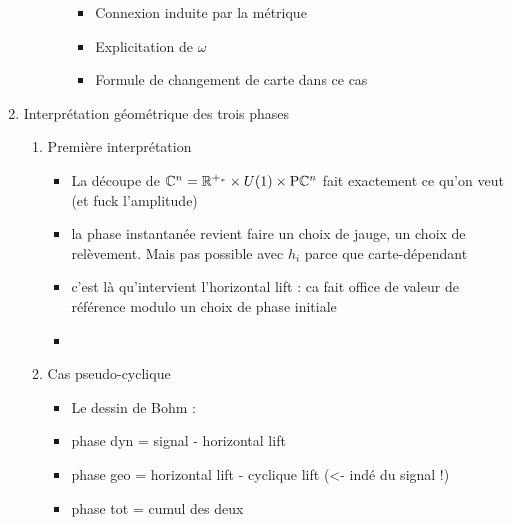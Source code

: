 \begin{enumerate}[label=\Roman* --- ]
\begin{enumerate}[label=\arabic{enumi}.\arabic* --- ]
\begin{enumerate}[label=\arabic{enumi}.2.\arabic* --- ]
\begin{itemize}
				\item Connexion induite par la métrique
				
				\item Explicitation de $\omega$
				
				\item Formule de changement de carte dans ce cas
			\end{itemize}
			
		\end{enumerate}
		
	\end{enumerate}
	
	\item Interprétation géométrique des trois phases
	
	\begin{enumerate}[label=\arabic{enumi}.\arabic* --- ]
		
		\item Première interprétation
		\begin{itemize} \normalfont
			
			\item La découpe de $\mathbb{C}^n = \mathbb{R}^{+_*}\times U(1) \times \text{\normalfont P}\mathbb{C}^{n}$ fait exactement ce qu'on veut (et fuck l'amplitude)
			
			\item la phase instantanée revient faire un choix de jauge, un choix de relèvement. Mais pas possible avec $h_i$ parce que carte-dépendant
			
			\item c'est là qu'intervient l'horizontal lift : ca fait office de valeur de référence modulo un choix de phase initiale
			
			\item 
		\end{itemize}
		
		\item Cas pseudo-cyclique
 		\begin{itemize} \normalfont
			
			\item Le dessin de Bohm :
			
			\item phase dyn =  signal - horizontal lift
			
			\item phase geo = horizontal lift - cyclique lift (<- indé du signal !)
			
			\item phase tot = cumul des deux
		\end{itemize}
		

\end{enumerate}
\end{enumerate}

